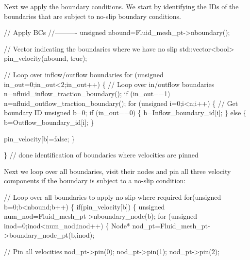 Next we apply the boundary conditions. We start by identifying the I\+Ds of the boundaries that are subject to no-\/slip boundary conditions.


\begin{DoxyCodeInclude}


 \textcolor{comment}{// Apply BCs}
 \textcolor{comment}{//----------}
 \textcolor{keywordtype}{unsigned} nbound=Fluid\_mesh\_pt->nboundary();

 \textcolor{comment}{// Vector indicating the boundaries where we have no slip}
 std::vector<bool> pin\_velocity(nbound, \textcolor{keyword}{true});
 
 \textcolor{comment}{// Loop over inflow/outflow boundaries}
 \textcolor{keywordflow}{for} (\textcolor{keywordtype}{unsigned} in\_out=0;in\_out<2;in\_out++)
  \{
   \textcolor{comment}{// Loop over in/outflow boundaries}
   n=nfluid\_inflow\_traction\_boundary();
   \textcolor{keywordflow}{if} (in\_out==1) n=nfluid\_outflow\_traction\_boundary();
   \textcolor{keywordflow}{for} (\textcolor{keywordtype}{unsigned} i=0;i<n;i++)
    \{
     \textcolor{comment}{// Get boundary ID}
     \textcolor{keywordtype}{unsigned} b=0;
     \textcolor{keywordflow}{if} (in\_out==0)
      \{
       b=Inflow\_boundary\_id[i];
      \}
     \textcolor{keywordflow}{else}
      \{
       b=Outflow\_boundary\_id[i];
      \}
     
     pin\_velocity[b]=\textcolor{keyword}{false};
    \}

  \} \textcolor{comment}{// done identification of boundaries where velocities are pinned}

\end{DoxyCodeInclude}


Next we loop over all boundaries, visit their nodes and pin all three velocity components if the boundary is subject to a no-\/slip condition\+:


\begin{DoxyCodeInclude}


 \textcolor{comment}{// Loop over all boundaries to apply no slip where required}
 \textcolor{keywordflow}{for}(\textcolor{keywordtype}{unsigned} b=0;b<nbound;b++)
  \{
   \textcolor{keywordflow}{if}(pin\_velocity[b])
    \{
     \textcolor{keywordtype}{unsigned} num\_nod=Fluid\_mesh\_pt->nboundary\_node(b);
     \textcolor{keywordflow}{for} (\textcolor{keywordtype}{unsigned} inod=0;inod<num\_nod;inod++)
      \{
       Node* nod\_pt=Fluid\_mesh\_pt->boundary\_node\_pt(b,inod);

       \textcolor{comment}{// Pin all velocities}
       nod\_pt->pin(0); 
       nod\_pt->pin(1); 
       nod\_pt->pin(2); 

\end{DoxyCodeInclude}


